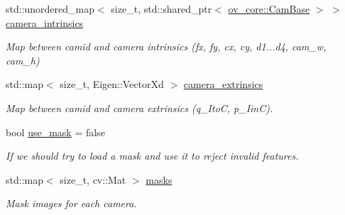 \begin{DoxyCompactItemize}
\mbox{\label{structov__msckf_1_1VioManagerOptions_ae5855bbb2f0191344acd87e2dbd6d39b}} 
std\+::unordered\+\_\+map$<$ size\+\_\+t, std\+::shared\+\_\+ptr$<$ \hyperlink{classov__core_1_1CamBase}{ov\+\_\+core\+::\+Cam\+Base} $>$ $>$ \hyperlink{structov__msckf_1_1VioManagerOptions_ae5855bbb2f0191344acd87e2dbd6d39b}{camera\+\_\+intrinsics}
\begin{DoxyCompactList}\small\item\em Map between camid and camera intrinsics (fx, fy, cx, cy, d1...d4, cam\+\_\+w, cam\+\_\+h) \end{DoxyCompactList}\item 
\mbox{\label{structov__msckf_1_1VioManagerOptions_ab5cecc1b5cf69b6835d9af0df4496401}} 
std\+::map$<$ size\+\_\+t, Eigen\+::\+Vector\+Xd $>$ \hyperlink{structov__msckf_1_1VioManagerOptions_ab5cecc1b5cf69b6835d9af0df4496401}{camera\+\_\+extrinsics}
\begin{DoxyCompactList}\small\item\em Map between camid and camera extrinsics (q\+\_\+\+ItoC, p\+\_\+\+IinC). \end{DoxyCompactList}\item 
\mbox{\label{structov__msckf_1_1VioManagerOptions_a3b74f8ceb35bd36df62d0e2403adcd25}} 
bool \hyperlink{structov__msckf_1_1VioManagerOptions_a3b74f8ceb35bd36df62d0e2403adcd25}{use\+\_\+mask} = false
\begin{DoxyCompactList}\small\item\em If we should try to load a mask and use it to reject invalid features. \end{DoxyCompactList}\item 
\mbox{\label{structov__msckf_1_1VioManagerOptions_ae4b385302e72d09d7c5abccb48a83442}} 
std\+::map$<$ size\+\_\+t, cv\+::\+Mat $>$ \hyperlink{structov__msckf_1_1VioManagerOptions_ae4b385302e72d09d7c5abccb48a83442}{masks}
\begin{DoxyCompactList}\small\item\em Mask images for each camera. \end{DoxyCompactList}\item 
\mbox{\label{structov__msckf_1_1VioManagerOptions_af01535da59b1d2d5e3309aaa34e69c8e}} 

\end{DoxyCompactItemize}
